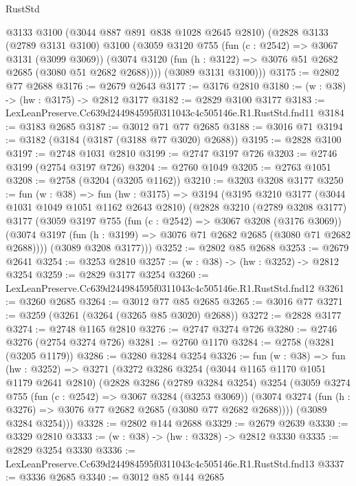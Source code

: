 \begin{lexlean}{RustStd}
\begin{coremodule}
      @3133
      @3100
      (@3044 @887 @891 @838 @1028 @2645 @2810)
      (@2828
        @3133
        (@2789 @3131 @3100)
        @3100
        (@3059
          @3120
          @755
          (fun (c : @2542) => @3067 @3131 (@3099 @3069))
          (@3074 @3120 (fun (h : @3122) => @3076 @51 @2682 @2685 (@3080 @51 @2682 @2688))))
        (@3089 @3131 @3100)))
@3175 := @2802 @77 @2688
@3176 := @2679 @2643
@3177 := @3176 @2810
@3180 := (w : @38) -> (hw : @3175) -> @2812 @3177
@3182 := @2829 @3100 @3177
@3183 := LexLeanPreserve.Cc639d244984595f0311043c4c505146e.R1.RustStd.fnd11
@3184 := @3183 @2685
@3187 := @3012 @71 @77 @2685
@3188 := @3016 @71
@3194 := @3182 (@3184 (@3187 (@3188 @77 @3020) @2688))
@3195 := @2828 @3100
@3197 := @2748 @1031 @2810
@3199 := @2747 @3197 @726
@3203 := @2746 @3199 (@2754 @3197 @726)
@3204 := @2760 @1049
@3205 := @2763 @1051
@3208 := @2758 (@3204 (@3205 @1162))
@3210 := @3203 @3208 @3177
@3250 := fun (w : @38) =>
  fun (hw : @3175) =>
  @3194
    (@3195
      @3210
      @3177
      (@3044 @1031 @1049 @1051 @1162 @2643 @2810)
      (@2828
        @3210
        (@2789 @3208 @3177)
        @3177
        (@3059
          @3197
          @755
          (fun (c : @2542) => @3067 @3208 (@3176 @3069))
          (@3074 @3197 (fun (h : @3199) => @3076 @71 @2682 @2685 (@3080 @71 @2682 @2688))))
        (@3089 @3208 @3177)))
@3252 := @2802 @85 @2688
@3253 := @2679 @2641
@3254 := @3253 @2810
@3257 := (w : @38) -> (hw : @3252) -> @2812 @3254
@3259 := @2829 @3177 @3254
@3260 := LexLeanPreserve.Cc639d244984595f0311043c4c505146e.R1.RustStd.fnd12
@3261 := @3260 @2685
@3264 := @3012 @77 @85 @2685
@3265 := @3016 @77
@3271 := @3259 (@3261 (@3264 (@3265 @85 @3020) @2688))
@3272 := @2828 @3177
@3274 := @2748 @1165 @2810
@3276 := @2747 @3274 @726
@3280 := @2746 @3276 (@2754 @3274 @726)
@3281 := @2760 @1170
@3284 := @2758 (@3281 (@3205 @1179))
@3286 := @3280 @3284 @3254
@3326 := fun (w : @38) =>
  fun (hw : @3252) =>
  @3271
    (@3272
      @3286
      @3254
      (@3044 @1165 @1170 @1051 @1179 @2641 @2810)
      (@2828
        @3286
        (@2789 @3284 @3254)
        @3254
        (@3059
          @3274
          @755
          (fun (c : @2542) => @3067 @3284 (@3253 @3069))
          (@3074 @3274 (fun (h : @3276) => @3076 @77 @2682 @2685 (@3080 @77 @2682 @2688))))
        (@3089 @3284 @3254)))
@3328 := @2802 @144 @2688
@3329 := @2679 @2639
@3330 := @3329 @2810
@3333 := (w : @38) -> (hw : @3328) -> @2812 @3330
@3335 := @2829 @3254 @3330
@3336 := LexLeanPreserve.Cc639d244984595f0311043c4c505146e.R1.RustStd.fnd13
@3337 := @3336 @2685
@3340 := @3012 @85 @144 @2685

\end{coremodule}
\end{lexlean}
